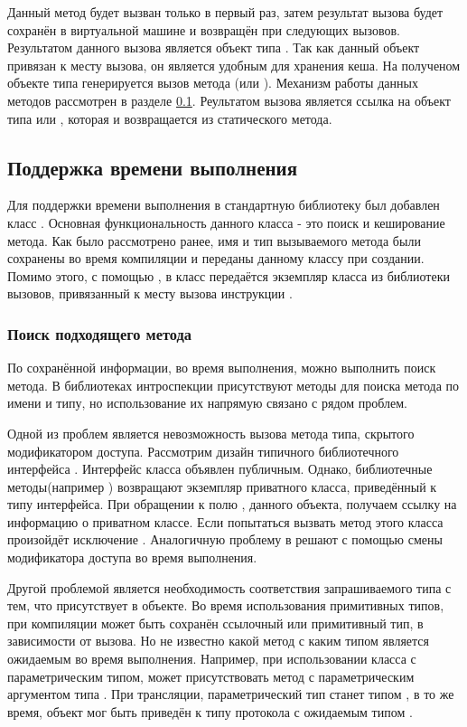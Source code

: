 Данный метод будет вызван только в первый раз, затем результат вызова будет сохранён в виртуальной машине и возвращён при следующих вызовов. Результатом данного вызова является объект типа . Так как данный объект привязан к месту вызова, он является удобным для хранения кеша. На полученом объекте типа  генерируется вызов метода (или ). Механизм работы данных методов рассмотрен в разделе \ref{runtime_info}. Реультатом вызова является ссылка на объект типа  или , которая и возвращается из статического метода.

\subsection{Поддержка времени выполнения} \label{runtime_info}
Для поддержки времени выполнения в стандартную библиотеку был добавлен класс . Основная функциональность данного класса - это поиск и кеширование метода. Как было рассмотрено ранее, имя и тип вызываемого метода были сохранены во время компиляции и переданы данному классу при создании. Помимо этого, с помощью , в класс передаётся экземпляр класса  из библиотеки вызовов, привязанный к месту вызова инструкции .

\subsubsection{Поиск подходящего метода}
По сохранённой информации, во время выполнения, можно выполнить поиск метода. В библиотеках интроспекции присутствуют методы для поиска метода по имени и типу, но использование их напрямую связано с рядом проблем.

Одной из проблем является невозможность вызова метода типа, скрытого модификатором доступа. Рассмотрим дизайн типичного библиотечного интерфейса . Интерфейс класса объявлен публичным. Однако, библиотечные методы(например ) возвращают экземпляр приватного класса, приведённый к типу интерфейса. При обращении к полю , данного объекта, получаем ссылку на информацию о приватном классе. Если попытаться вызвать метод этого класса произойдёт исключение . Аналогичную проблему в  решают с помощью смены модификатора доступа во время выполнения.

Другой проблемой является необходимость соответствия запрашиваемого типа с тем, что присутствует в объекте. Во время использования примитивных типов, при компиляции может быть сохранён ссылочный или примитивный тип, в зависимости от вызова. Но не известно какой метод с каким типом является ожидаемым во время выполнения. Например, при использовании класса с параметрическим типом, может присутствовать метод с параметрическим аргументом типа . При трансляции, параметрический тип станет типом , в то же время, объект мог быть приведён к типу протокола с ожидаемым типом .

